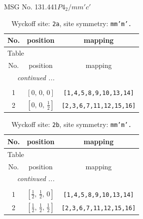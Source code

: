 \documentclass[fleqn,8pt]{jsarticle}
\begin{document}
\setcounter{MaxMatrixCols}{32}

\renewcommand{\tablename}{Table~}
\renewcommand{\figurename}{Figure~}
\begin{center}
\LARGE
MSG No. 131.441\quad$P4_{2}/mm'c'$
\end{center}
\renewcommand{\arraystretch}{1.2}
\begin{longtable}{ccc}
\caption{Wyckoff site: {\tt 2a}, site symmetry: {\tt mm'm'.}}
 \\
 \hline \hline
No. & position & mapping \\ \hline \endfirsthead

\multicolumn{2}{l}{\tablename\ \thetable{}} \\
 \hline \hline
No. & position & mapping \\ \hline \endhead

 \hline \hline
\multicolumn{2}{r}{\footnotesize\it continued ...} \\ \endfoot

 \hline \hline
\multicolumn{2}{r}{} \\ \endlastfoot

1 & $\left[ 0,\, 0,\, 0 \right]$ & {\tt [1,4,5,8,9,10,13,14]} \\ \hline
2 & $\left[ 0,\, 0,\, \frac{1}{2} \right]$ & {\tt [2,3,6,7,11,12,15,16]} \\
\end{longtable}
\renewcommand{\arraystretch}{1.2}
\begin{longtable}{ccc}
\caption{Wyckoff site: {\tt 2b}, site symmetry: {\tt mm'm'.}}
 \\
 \hline \hline
No. & position & mapping \\ \hline \endfirsthead

\multicolumn{2}{l}{\tablename\ \thetable{}} \\
 \hline \hline
No. & position & mapping \\ \hline \endhead

 \hline \hline
\multicolumn{2}{r}{\footnotesize\it continued ...} \\ \endfoot

 \hline \hline
\multicolumn{2}{r}{} \\ \endlastfoot

1 & $\left[ \frac{1}{2},\, \frac{1}{2},\, 0 \right]$ & {\tt [1,4,5,8,9,10,13,14]} \\ \hline
2 & $\left[ \frac{1}{2},\, \frac{1}{2},\, \frac{1}{2} \right]$ & {\tt [2,3,6,7,11,12,15,16]} \\
\end{longtable}
\end{document}
